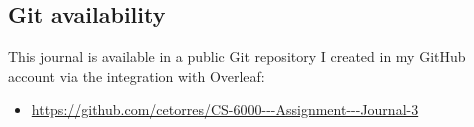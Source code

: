 \subsection{Git availability}

This journal is available in a public Git repository I created in my GitHub account via the integration with Overleaf:
\begin{itemize}
    \item \url{https://github.com/cetorres/CS-6000---Assignment---Journal-3}
\end{itemize}